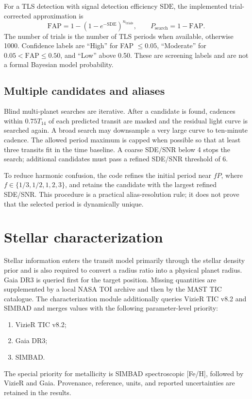 \documentclass[12pt,a4paper,oneside]{report}
\newcommand{\Tfourteen}{\ensuremath{T_{14}}}
\begin{document}
For a TLS detection with signal detection efficiency \(\mathrm{SDE}\), the
implemented trial-corrected approximation is
\begin{equation}
  \mathrm{FAP}=1-\left(1-e^{-\mathrm{SDE}}\right)^{n_{\mathrm{trials}}},
  \qquad P_{\mathrm{search}}=1-\mathrm{FAP}.
\end{equation}
The number of trials is the number of TLS periods when available, otherwise
1000. Confidence labels are ``High'' for FAP \(\leq 0.05\), ``Moderate'' for
\(0.05<\mathrm{FAP}\leq0.50\), and ``Low'' above 0.50. These are screening
labels and are not a formal Bayesian model probability.

\subsection{Multiple candidates and aliases}
Blind multi-planet searches are iterative. After a candidate is found, cadences
within \(0.75\Tfourteen\) of each predicted transit are masked and the residual
light curve is searched again. A broad search may downsample a very large curve
to ten-minute cadence. The allowed period maximum is capped when possible so
that at least three transits fit in the time baseline. A coarse SDE/SNR below
4 stops the search; additional candidates must pass a refined SDE/SNR threshold
of 6.

To reduce harmonic confusion, the code refines the initial period near
\(fP\), where \(f\in\{1/3,1/2,1,2,3\}\), and retains the candidate with the
largest refined SDE/SNR. This procedure is a practical alias-resolution rule;
it does not prove that the selected period is dynamically unique.

\section{Stellar characterization}
Stellar information enters the transit model primarily through the stellar
density prior and is also required to convert a radius ratio into a physical
planet radius. Gaia DR3 is queried first for the target position. Missing
quantities are supplemented by a local NASA TOI archive and then by the MAST
TIC catalogue. The characterization module additionally queries VizieR TIC
v8.2 and SIMBAD and merges values with the following parameter-level priority:
\begin{enumerate}
  \item VizieR TIC v8.2;
  \item Gaia DR3;
  \item SIMBAD.
\end{enumerate}
The special priority for metallicity is SIMBAD spectroscopic [Fe/H], followed
by VizieR and Gaia. Provenance, reference, units, and reported uncertainties
are retained in the results.
\end{document}
